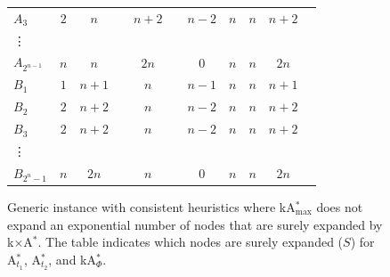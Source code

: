 \documentclass[smallextended]{svjour3}       %
\newcommand{\cmark}{\textcolor{green}{\ding{51}}}
\newcommand{\xmark}{\textcolor{red}{\ding{55}}}
\newcommand{\kastarvar}[1]{\textup{kA}$^*_{#1}$\xspace}
\newcommand{\kastarmax}{\kastarvar{\max}}
\newcommand{\kastarphi}{\textup{kA}$^*_{\Phi}$\xspace}
\newcommand{\kxastar}{k$\times$A$^*$\xspace}
\newcommand{\astari}[1]{A$^*_{#1}$\xspace}
\begin{document}
\begin{figure}
{\begin{tabular}[b]{l*{10}{c}}
	$A_3$       & $2$   & $n$   & \cmark & $n+2$ & \xmark & $n-2$ & $n$   & $n$   & $n+2$ & \cmark \\
	\vdots\\
	$A_{2^{n-1}}$ & $n$ & $n$   & \cmark & $2n$  & \xmark & $0$   & $n$   & $n$   & $2n$  & \cmark \\
	$B_1$       & $1$   & $n+1$ & \xmark & $n$   & \cmark & $n-1$ & $n$   & $n$   & $n+1$ & \cmark \\
	$B_2$       & $2$   & $n+2$ & \xmark & $n$   & \cmark & $n-2$ & $n$   & $n$   & $n+2$ & \cmark \\
	$B_3$       & $2$   & $n+2$ & \xmark & $n$   & \cmark & $n-2$ & $n$   & $n$   & $n+2$ & \cmark \\
	\vdots\\
	$B_{2^n-1}$ & $n$   & $2n$  & \xmark & $n$   & \cmark & $0$   & $n$   & $n$   & $2n$  & \cmark \\
	\bottomrule
	\end{tabular}
	}
	\caption{Generic instance with consistent heuristics where \kastarmax does not expand an exponential number of nodes that are surely expanded by \kxastar.
	The table indicates which nodes are surely expanded ($S$) for \astari{t_1}, \astari{t_2}, and \kastarphi.
	}
	\label{fig:kastarmax-surely-skipped-many}
\end{figure}








\end{document}
